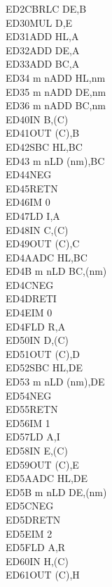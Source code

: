 \begin{multicols}{3}
{\begin{tabbing}
    ED2C\>BRLC DE,B\ZXN\\
    ED30\>MUL D,E\ZXN\\
    ED31\>ADD HL,A\ZXN\\
    ED32\>ADD DE,A\ZXN\\
    ED33\>ADD BC,A\ZXN\\
    ED34 m n\>ADD HL,nm\ZXN\\
    ED35 m n\>ADD DE,nm\ZXN\\
    ED36 m n\>ADD BC,nm\ZXN\\
    ED40\>IN B,(C)\\
    ED41\>OUT (C),B\\
    ED42\>SBC HL,BC\\
    ED43 m n\>LD (nm),BC\\
    ED44\>NEG\\
    ED45\>RETN\\
    ED46\>IM 0\\
    ED47\>LD I,A\\
    ED48\>IN C,(C)\\
    ED49\>OUT (C),C\\
    ED4A\>ADC HL,BC\\
    ED4B m n\>LD BC,(nm)\\
    ED4C\>NEG\UNDOC\\
    ED4D\>RETI\\
    ED4E\>IM 0\UNDOC\\
    ED4F\>LD R,A\\
    ED50\>IN D,(C)\\
    ED51\>OUT (C),D\\
    ED52\>SBC HL,DE\\
    ED53 m n\>LD (nm),DE\\
    ED54\>NEG\UNDOC\\
    ED55\>RETN\UNDOC\\
    ED56\>IM 1\\
    ED57\>LD A,I\\
    ED58\>IN E,(C)\\
    ED59\>OUT (C),E\\
    ED5A\>ADC HL,DE\\
    ED5B m n\>LD DE,(nm)\\
    ED5C\>NEG\UNDOC\\
    ED5D\>RETN\UNDOC\\
    ED5E\>IM 2\\
    ED5F\>LD A,R\\
    ED60\>IN H,(C)\\
    ED61\>OUT (C),H\\

\end{tabbing}}
\end{multicols}
